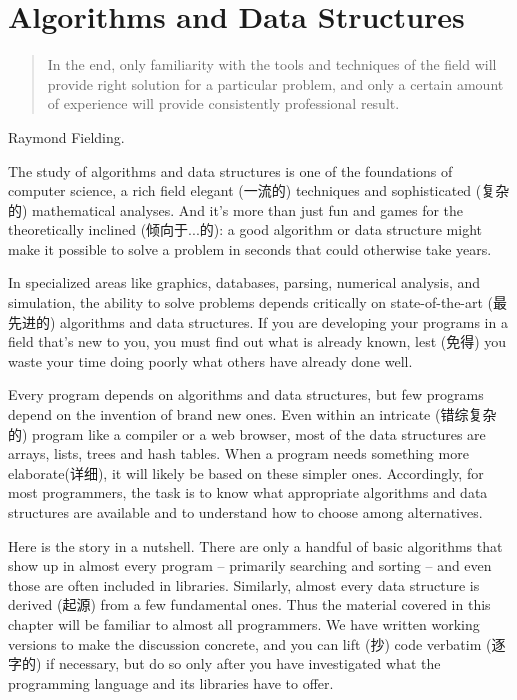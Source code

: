 \chapter{Algorithms and Data Structures}
\label{chap:alds}
\begin{quote}
    In the end, only familiarity with the tools and techniques of the field
    will provide right solution for a particular problem, and only a
    certain amount of experience will provide consistently professional
    result.
\end{quote}
\begin{quotesrc}
    Raymond Fielding.
\end{quotesrc}
The study of algorithms and data structures is one of the foundations of
computer science, a rich field elegant (一流的) techniques and
sophisticated (复杂的) mathematical analyses. And it's more than just fun
and games for the theoretically inclined (倾向于...的): a good algorithm or
data structure might make it possible to solve a problem in seconds that
could otherwise take years.

In specialized areas like graphics, databases, parsing, numerical analysis,
and simulation, the ability to solve problems depends critically on
state-of-the-art (最先进的) algorithms and data structures. If you are
developing your programs in a field that's new to you, you must find out
what is already known, lest (免得) you waste your time doing poorly what
others have already done well.

Every program depends on algorithms and data structures, but few programs
depend on the invention of brand new ones. Even within an intricate
(错综复杂的) program like a compiler or a web browser, most of the data
structures are arrays, lists, trees and hash tables. When a program needs
something more elaborate(详细), it will likely be based on these simpler
ones. Accordingly, for most programmers, the task is to know what
appropriate algorithms and data structures are available and to understand
how to choose among alternatives.

Here is the story in a nutshell. There are only a handful of basic
algorithms that show up in almost every program -- primarily searching and
sorting -- and even those are often included in libraries. Similarly,
almost every data structure is derived (起源) from a few fundamental ones.
Thus the material covered in this chapter will be familiar to almost all
programmers. We have written working versions to make the discussion
concrete, and you can lift (抄) code verbatim (逐字的) if necessary, but do
so only after you have investigated what the programming language and its
libraries have to offer.

